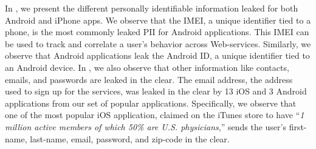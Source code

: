 In , we present the different personally identifiable
information leaked for both Android and iPhone apps.  We observe that
the IMEI, a unique identifier tied to a phone, is the most commonly
leaked PII for Android applications.  This IMEI can be used to track
and correlate a user's behavior across Web-services.  Similarly, we
observe that Android applications leak the Android ID, a unique
identifier tied to an Android device.  In , we also
observe that other information like contacts, emails, and passwords
are leaked in the clear.  The email address, the address used to sign
up for the services, was leaked in the clear by 13 iOS and 3 Android
applications from our set of popular applications.
Specifically, we observe that one of the most popular iOS application, claimed on the iTunes store to have ``\emph{1 million active members of which 50\% are U.S. physicians},'' sends the user's first-name, last-name, email, password, and zip-code in the clear. 



